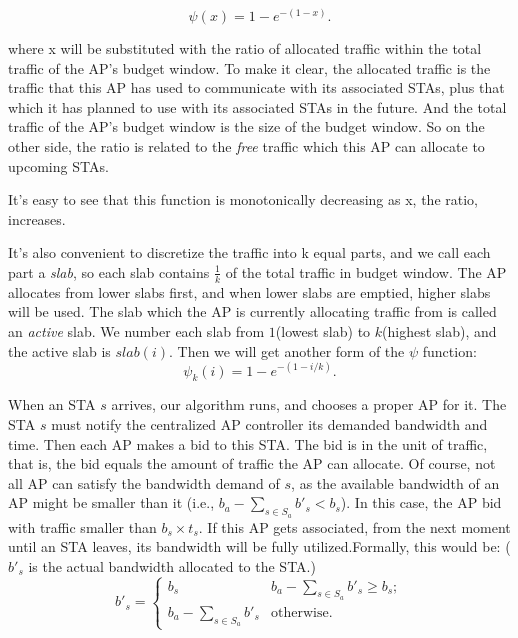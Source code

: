 \documentclass[conference]{IEEEtran}
\begin{document}
  \begin{displaymath}
    \psi(x) = 1-e^{-(1-x)}.
  \end{displaymath}

  where x will be substituted with the ratio of allocated traffic within the total traffic of the AP's budget window. To make it clear, the allocated traffic is the traffic that this AP has used to communicate with its associated STAs, plus that which it has planned to use with its associated STAs in the future. And the total traffic of the AP's budget window is the size of the budget window. So on the other side, the ratio is related to the \emph{free} traffic which this AP can allocate to upcoming STAs.

  It's easy to see that this function is monotonically decreasing as x, the ratio, increases.

  It's also convenient to discretize the traffic into k equal parts, and we call each part a \emph{slab}, so each slab contains $\frac{1}{k}$ of the total traffic in budget window. The AP allocates from lower slabs first, and when lower slabs are emptied, higher slabs will be used. The slab which the AP is currently allocating traffic from is called an \emph{active} slab. We number each slab from $1$(lowest slab) to $k$(highest slab), and the active slab is $slab(i)$. Then we will get another form of the $\psi$ function:
  \begin{displaymath}
    \psi_k(i) = 1-e^{-(1-i/k)}.
  \end{displaymath}

   When an STA $s$ arrives, our algorithm runs, and chooses a proper AP for it. The STA $s$ must notify the centralized AP controller its demanded bandwidth and time. Then each AP makes a bid to this STA. The bid is in the unit of traffic, that is, the bid equals the amount of traffic the AP can allocate. Of course, not all AP can satisfy the bandwidth demand of $s$, as the available bandwidth of an AP might be smaller than it (i.e., $b_a-\sum_{s \in S_a}{b'_s} < b_s$). In this case, the AP bid with traffic smaller than $b_s \times t_s$. If this AP gets associated, from the next moment until an STA leaves, its bandwidth will be fully utilized.Formally, this would be: ($b'_s$ is the actual bandwidth allocated to the STA.)
  \begin{displaymath}
    b'_s = \begin{cases}
      b_s & b_a-\sum_{s \in S_a}{b'_s} \ge b_s; \\
      b_a-\sum_{s \in S_a}{b'_s} & \text{otherwise.}
    \end{cases}
  \end{displaymath}
\end{document}
